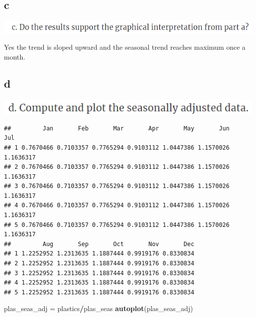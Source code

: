 \documentclass[]{book}
\newenvironment{Shaded}{\begin{snugshade}}{\end{snugshade}}
\newcommand{\DataTypeTok}[1]{\textcolor[rgb]{0.13,0.29,0.53}{#1}}
\newcommand{\KeywordTok}[1]{\textcolor[rgb]{0.13,0.29,0.53}{\textbf{#1}}}
\newcommand{\NormalTok}[1]{#1}
\newcommand{\OperatorTok}[1]{\textcolor[rgb]{0.81,0.36,0.00}{\textbf{#1}}}
\newcommand{\StringTok}[1]{\textcolor[rgb]{0.31,0.60,0.02}{#1}}
\begin{document}
\hypertarget{c-2}{%
\subsection{c}\label{c-2}}

\includegraphics{./week2/6.2c.png}

Yes the trend is sloped upward and the seasonal trend reaches maximum once a month.

\hypertarget{d-1}{%
\subsection{d}\label{d-1}}

\includegraphics{./week2/6.2d.png}

\begin{Shaded}
\end{Shaded}

\begin{verbatim}
##         Jan       Feb       Mar       Apr       May       Jun       Jul
## 1 0.7670466 0.7103357 0.7765294 0.9103112 1.0447386 1.1570026 1.1636317
## 2 0.7670466 0.7103357 0.7765294 0.9103112 1.0447386 1.1570026 1.1636317
## 3 0.7670466 0.7103357 0.7765294 0.9103112 1.0447386 1.1570026 1.1636317
## 4 0.7670466 0.7103357 0.7765294 0.9103112 1.0447386 1.1570026 1.1636317
## 5 0.7670466 0.7103357 0.7765294 0.9103112 1.0447386 1.1570026 1.1636317
##         Aug       Sep       Oct       Nov       Dec
## 1 1.2252952 1.2313635 1.1887444 0.9919176 0.8330834
## 2 1.2252952 1.2313635 1.1887444 0.9919176 0.8330834
## 3 1.2252952 1.2313635 1.1887444 0.9919176 0.8330834
## 4 1.2252952 1.2313635 1.1887444 0.9919176 0.8330834
## 5 1.2252952 1.2313635 1.1887444 0.9919176 0.8330834
\end{verbatim}

\begin{Shaded}
\begin{Highlighting}[]
\NormalTok{plas_seas_adj =}\StringTok{ }\NormalTok{plastics}\OperatorTok{/}\NormalTok{plas_seas}
\KeywordTok{autoplot}\NormalTok{(plas_seas_adj)}
\end{Highlighting}
\end{Shaded}
\end{document}
